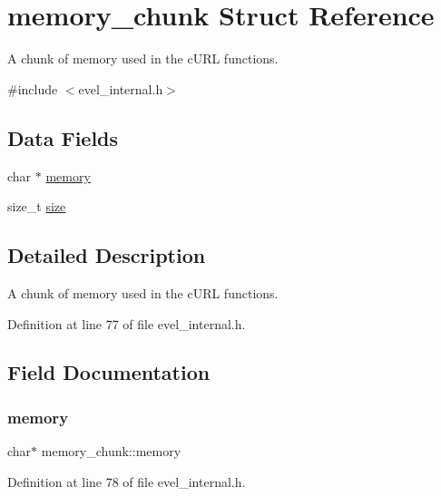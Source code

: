 \hypertarget{structmemory__chunk}{}\section{memory\+\_\+chunk Struct Reference}
\label{structmemory__chunk}


A chunk of memory used in the c\+U\+RL functions.  




{\ttfamily \#include $<$evel\+\_\+internal.\+h$>$}

\subsection*{Data Fields}
\begin{DoxyCompactItemize}
\item 
char $\ast$ \hyperlink{structmemory__chunk_aa0c25575887b3d8a2117f1fbb2c7c335}{memory}
\item 
size\+\_\+t \hyperlink{structmemory__chunk_abf98e30fa06d9af77beb446660be9c27}{size}
\end{DoxyCompactItemize}


\subsection{Detailed Description}
A chunk of memory used in the c\+U\+RL functions. 

Definition at line 77 of file evel\+\_\+internal.\+h.



\subsection{Field Documentation}
\hypertarget{structmemory__chunk_aa0c25575887b3d8a2117f1fbb2c7c335}{}\label{structmemory__chunk_aa0c25575887b3d8a2117f1fbb2c7c335} 
\subsubsection{\texorpdfstring{memory}{memory}}
{\footnotesize\ttfamily char$\ast$ memory\+\_\+chunk\+::memory}



Definition at line 78 of file evel\+\_\+internal.\+h.

\hypertarget{structmemory__chunk_abf98e30fa06d9af77beb446660be9c27}{}\label{structmemory__chunk_abf98e30fa06d9af77beb446660be9c27} 
